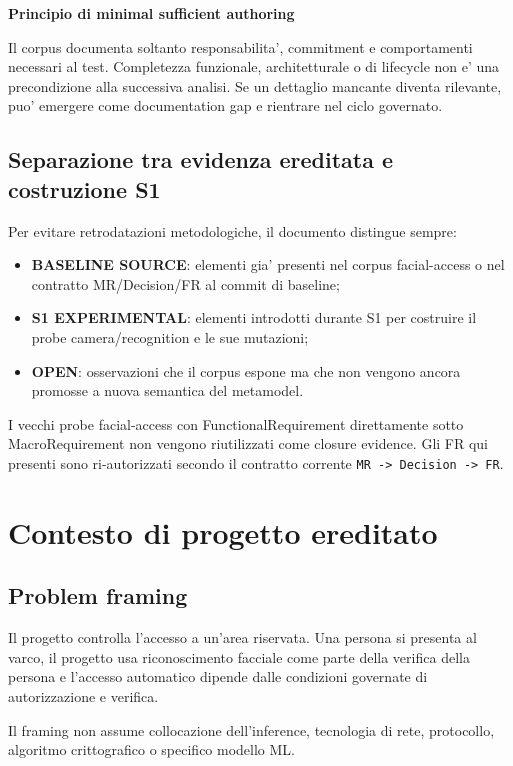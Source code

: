 \documentclass[11pt,a4paper]{article}
\newcommand{\openstatus}{\textbf{OPEN}}
\newcommand{\sourcebaseline}{\textbf{BASELINE SOURCE}}
\newcommand{\experimental}{\textbf{S1 EXPERIMENTAL}}
\newenvironment{statusbox}[1]{%
  \def\FrameCommand{\fcolorbox{ddtablue}{ddtagray}}%
  \MakeFramed{\advance\hsize-2\width\FrameRestore}
  \noindent\textbf{#1}\par\smallskip
}{\endMakeFramed}
\begin{document}
\begin{statusbox}{Principio di minimal sufficient authoring}
Il corpus documenta soltanto responsabilita', commitment e comportamenti necessari al test. Completezza funzionale, architetturale o di lifecycle non e' una precondizione alla successiva analisi. Se un dettaglio mancante diventa rilevante, puo' emergere come documentation gap e rientrare nel ciclo governato.
\end{statusbox}

\subsection{Separazione tra evidenza ereditata e costruzione S1}

Per evitare retrodatazioni metodologiche, il documento distingue sempre:

\begin{itemize}
  \item \sourcebaseline{}: elementi gia' presenti nel corpus facial-access o nel contratto MR/Decision/FR al commit di baseline;
  \item \experimental{}: elementi introdotti durante S1 per costruire il probe camera/recognition e le sue mutazioni;
  \item \openstatus{}: osservazioni che il corpus espone ma che non vengono ancora promosse a nuova semantica del metamodel.
\end{itemize}

I vecchi probe facial-access con FunctionalRequirement direttamente sotto MacroRequirement non vengono riutilizzati come closure evidence. Gli FR qui presenti sono ri-autorizzati secondo il contratto corrente \texttt{MR -> Decision -> FR}.

\section{Contesto di progetto ereditato}

\subsection{Problem framing}

Il progetto controlla l'accesso a un'area riservata. Una persona si presenta al varco, il progetto usa riconoscimento facciale come parte della verifica della persona e l'accesso automatico dipende dalle condizioni governate di autorizzazione e verifica.

Il framing non assume collocazione dell'inference, tecnologia di rete, protocollo, algoritmo crittografico o specifico modello ML.
\end{document}
